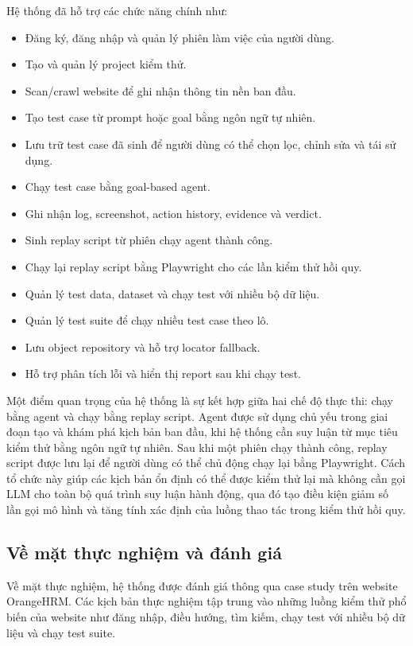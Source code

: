 Hệ thống đã hỗ trợ các chức năng chính như:

\begin{itemize}
    \item Đăng ký, đăng nhập và quản lý phiên làm việc của người dùng.
    \item Tạo và quản lý project kiểm thử.
    \item Scan/crawl website để ghi nhận thông tin nền ban đầu.
    \item Tạo test case từ prompt hoặc goal bằng ngôn ngữ tự nhiên.
    \item Lưu trữ test case đã sinh để người dùng có thể chọn lọc, chỉnh sửa và tái sử dụng.
    \item Chạy test case bằng goal-based agent.
    \item Ghi nhận log, screenshot, action history, evidence và verdict.
    \item Sinh replay script từ phiên chạy agent thành công.
    \item Chạy lại replay script bằng Playwright cho các lần kiểm thử hồi quy.
    \item Quản lý test data, dataset và chạy test với nhiều bộ dữ liệu.
    \item Quản lý test suite để chạy nhiều test case theo lô.
    \item Lưu object repository và hỗ trợ locator fallback.
    \item Hỗ trợ phân tích lỗi và hiển thị report sau khi chạy test.
\end{itemize}

Một điểm quan trọng của hệ thống là sự kết hợp giữa hai chế độ thực thi: chạy bằng agent và chạy bằng replay script. Agent được sử dụng chủ yếu trong giai đoạn tạo và khám phá kịch bản ban đầu, khi hệ thống cần suy luận từ mục tiêu kiểm thử bằng ngôn ngữ tự nhiên. Sau khi một phiên chạy thành công, replay script được lưu lại để người dùng có thể chủ động chạy lại bằng Playwright. Cách tổ chức này giúp các kịch bản ổn định có thể được kiểm thử lại mà không cần gọi LLM cho toàn bộ quá trình suy luận hành động, qua đó tạo điều kiện giảm số lần gọi mô hình và tăng tính xác định của luồng thao tác trong kiểm thử hồi quy.

\subsection{Về mặt thực nghiệm và đánh giá}

Về mặt thực nghiệm, hệ thống được đánh giá thông qua case study trên website OrangeHRM. Các kịch bản thực nghiệm tập trung vào những luồng kiểm thử phổ biến của website như đăng nhập, điều hướng, tìm kiếm, chạy test với nhiều bộ dữ liệu và chạy test suite.

